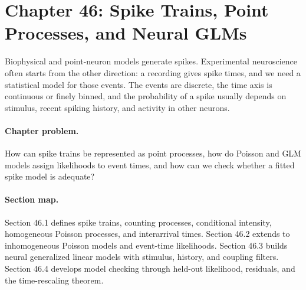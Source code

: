 \section{Chapter 46: Spike Trains, Point Processes, and Neural GLMs}
\label{ch:spike-trains-point-processes-neural-glms}

Biophysical and point-neuron models generate spikes. Experimental neuroscience often starts from the other direction: a recording gives spike times, and we need a statistical model for those events. The events are discrete, the time axis is continuous or finely binned, and the probability of a spike usually depends on stimulus, recent spiking history, and activity in other neurons.

\paragraph{Chapter problem.}
How can spike trains be represented as point processes, how do Poisson and GLM models assign likelihoods to event times, and how can we check whether a fitted spike model is adequate?

\paragraph{Section map.}
Section 46.1 defines spike trains, counting processes, conditional intensity, homogeneous Poisson processes, and interarrival times. Section 46.2 extends to inhomogeneous Poisson models and event-time likelihoods. Section 46.3 builds neural generalized linear models with stimulus, history, and coupling filters. Section 46.4 develops model checking through held-out likelihood, residuals, and the time-rescaling theorem.

